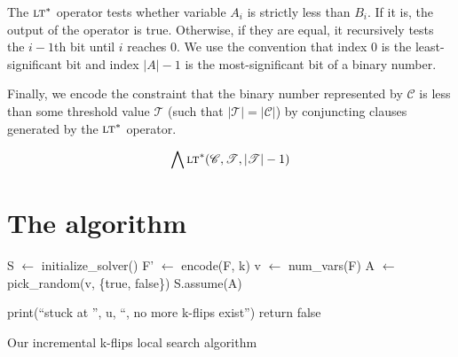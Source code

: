 \documentclass{article}
\begin{document}
\noindent The $\textsc{lt}^*$ operator tests whether variable $A_i$ is strictly
less than $B_i$. If it is, the output of the operator is true. Otherwise, if
they are equal, it recursively tests the $i - 1$th bit until $i$ reaches $0$. We
use the convention that index $0$ is the least-significant bit and index $\vert
A \vert - 1$ is the most-significant bit of a binary number.

Finally, we encode the constraint that the binary number represented by
$\mathscr{C}$ is less than some threshold value $\mathscr{T}$ (such that  $\vert
\mathscr{T} \vert = \vert \mathscr{C} \vert$) by conjuncting clauses generated
by the $\textsc{lt}^*$ operator.

\begin{equation}
  \bigwedge \textsc{lt}^*(\mathscr{C}, \mathscr{T}, \vert \mathscr{T} \vert - 1)
\end{equation}

\break

\section{The algorithm}

\begin{algorithm}[H]
\SetAlgoLined
\DontPrintSemicolon

  \;

  S $\gets$ initialize\_solver()\;
  F' $\gets$ encode(F, k)\;
  v $\gets$ num\_vars(F)\;
  A $\gets$ pick\_random(v, \{true, false\})\;
  S.assume(A)\;
  \;

 \;
   {
    print(“stuck at ”, u, “, no more k-flips exist”)\;
    return false
  }
 \caption{Our incremental k-flips local search algorithm}
\end{algorithm}
\end{document}
